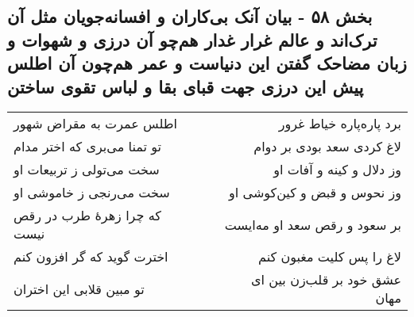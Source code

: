 \begin{center}
\section*{بخش ۵۸ - بیان آنک بی‌کاران و افسانه‌جویان مثل آن ترک‌اند و عالم غرار غدار هم‌چو آن درزی و شهوات و زبان مضاحک گفتن این دنیاست و عمر هم‌چون آن اطلس پیش این درزی جهت قبای بقا و لباس تقوی ساختن}
\label{sec:sh058}
\begin{longtable}{l p{0.5cm} r}
اطلس عمرت به مقراض شهور
&&
برد پاره‌پاره خیاط غرور
\\
تو تمنا می‌بری که اختر مدام
&&
لاغ کردی سعد بودی بر دوام
\\
سخت می‌تولی ز تربیعات او
&&
وز دلال و کینه و آفات او
\\
سخت می‌رنجی ز خاموشی او
&&
وز نحوس و قبض و کین‌کوشی او
\\
که چرا زهرهٔ طرب در رقص نیست
&&
بر سعود و رقص سعد او مه‌ایست
\\
اخترت گوید که گر افزون کنم
&&
لاغ را پس کلیت مغبون کنم
\\
تو مبین قلابی این اختران
&&
عشق خود بر قلب‌زن بین ای مهان
\\
\end{longtable}
\end{center}
